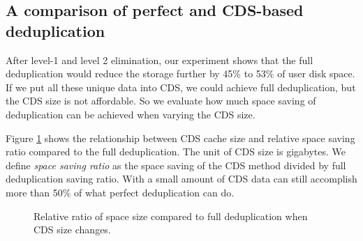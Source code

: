 

\subsection{A comparison of perfect and CDS-based deduplication }
After level-1 and level 2 elimination, our experiment shows that 
the full deduplication would reduce the storage  further   by  45\% to 53\% of user disk space. 
If we put all these unique data into CDS, we could achieve full deduplication,
but the CDS size is not affordable. So we evaluate how much space saving of 
deduplication can be achieved when varying the CDS size.

Figure \ref{fig:datacdssize} shows the relationship between CDS cache size and relative space saving ratio
compared to the full deduplication.  The unit of CDS size is gigabytes.
We define \emph{space saving ratio} as the space saving of the CDS method divided by 
full deduplication saving ratio. 
With a small amount of CDS data can still  accomplish more than 50\% of what perfect deduplication can do.

\begin{figure}
  \centering
  \caption{Relative ratio of space size compared to full deduplication when CDS size changes.}
  \label{fig:datacdssize}
\end{figure}

